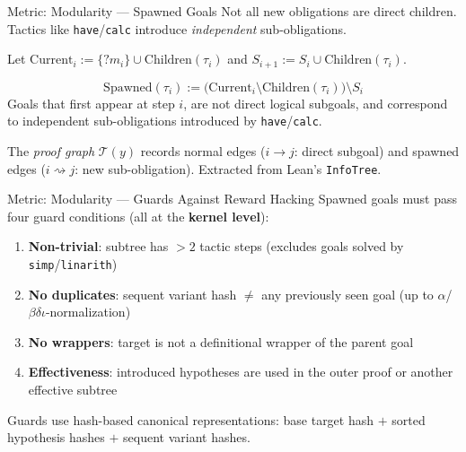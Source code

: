 \documentclass{beamer}
\begin{document}
\begin{frame}{Metric: Modularity --- Spawned Goals}
\vspace{0.2em}
Not all new obligations are direct children. Tactics like \texttt{have}/\texttt{calc} introduce \emph{independent} sub-obligations.
\vspace{0.2em}

Let $\mathrm{Current}_i := \{?m_i\} \cup \mathrm{Children}(\tau_i)$ and $S_{i+1} := S_i \cup \mathrm{Children}(\tau_i)$.
\vspace{0.2em}
\begin{definition}
\[
  \mathrm{Spawned}(\tau_i) := \bigl(\mathrm{Current}_i \setminus \mathrm{Children}(\tau_i)\bigr) \setminus S_i
\]
Goals that first appear at step $i$, are not direct logical subgoals, and correspond to independent sub-obligations introduced by \texttt{have}/\texttt{calc}.
\end{definition}
\vspace{0.2em}
\small The \emph{proof graph} $\mathcal{T}(y)$ records normal edges ($i \to j$: direct subgoal) and spawned edges ($i \rightsquigarrow j$: new sub-obligation). Extracted from Lean's \texttt{InfoTree}.
\end{frame}

\begin{frame}{Metric: Modularity --- Guards Against Reward Hacking}
\vspace{0.3em}
Spawned goals must pass four guard conditions (all at the \textbf{kernel level}):
\vspace{0.2em}
\begin{enumerate}\setlength{\itemsep}{4pt}
  \item \textbf{Non-trivial}: subtree has $> 2$ tactic steps (excludes goals solved by \texttt{simp}/\texttt{linarith})
  \item \textbf{No duplicates}: sequent variant hash $\neq$ any previously seen goal (up to $\alpha$/$\beta\delta\iota$-normalization)
  \item \textbf{No wrappers}: target is not a definitional wrapper of the parent goal
  \item \textbf{Effectiveness}: introduced hypotheses are used in the outer proof or another effective subtree
\end{enumerate}
\vspace{0.2em}
\small Guards use hash-based canonical representations: base target hash $+$ sorted hypothesis hashes $+$ sequent variant hashes.
\end{frame}
\end{document}
